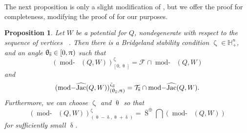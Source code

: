 \documentclass[a4paper,10pt]{amsart}
\newtheorem{proposition}[theorem]{Proposition}
\DeclareMathOperator{\Simp}{S}
\newcommand{\shave}{\overline{\Simp}_{\Ss}}
\renewcommand{\theta}{\uptheta}
\renewcommand{\delta}{\updelta}
\renewcommand{\zeta}{\upzeta}
\renewcommand{\pi}{\uppi\hspace{0.05em}}
\DeclareMathOperator{\tmod}{mod-}
\newcommand{\rmod}[1]{\tmod\!#1}
\DeclareMathOperator{\HJac}{\widehat{Jac}}
\DeclareMathOperator{\Ss}{\overline{s}}
\begin{document}
The next proposition is only a slight modification of \cite[Prop.4.1]{Na13}, but we offer the proof for completeness, modifying the proof of \cite[Thm.4.17]{Efi11} for our purposes.
\begin{proposition}
\label{zetaTheta}
Let $W$ be a potential for $Q$, nondegenerate with respect to the sequence of vertices $\Ss$.  Then there is a Bridgeland stability condition $\zeta_{\Ss}\in\mathbb{H}_+^{n}$, and an angle $\theta_{\Ss}\in [0,\pi)$ such that 
\[
(\rmod{\HJac(Q,W)})^{\zeta_{\Ss}}_{[0,\theta_{\Ss}]}=\mathcal{F}_{\Ss}\cap \rmod{\HJac(Q,W)}
\]
and
\[
(\rmod{\HJac(Q,W)})^{\zeta_{\Ss}}_{(\theta_{\Ss},\pi)}=\mathcal{T}_{\Ss}\cap\rmod{\HJac(Q,W)}.
\]
Furthermore, we can choose $\zeta_{\Ss}$ and $\theta_{\Ss}$ so that 
\[
(\rmod{\HJac(Q,W)})^{\zeta_{\Ss}}_{(\theta_{\Ss}-\delta,\theta_{\Ss}+\delta)}=\shave^{\oplus}\bigcap \left(\rmod{\HJac(Q,W)}\right)
\]
for sufficiently small $\delta$.

\end{proposition}
\end{document}
